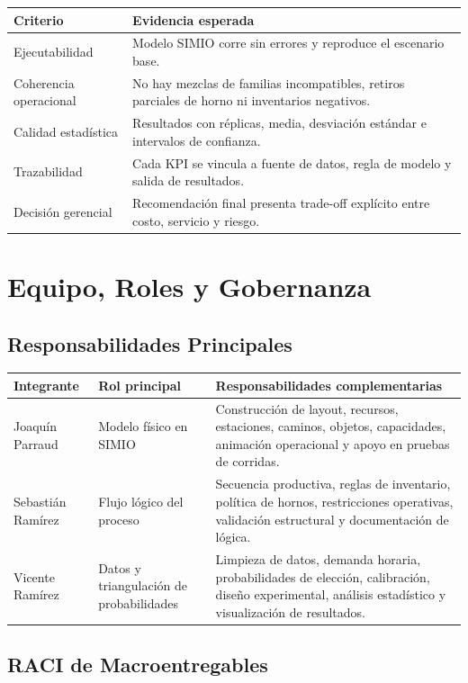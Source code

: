 \documentclass[11pt,letterpaper]{article}
\begin{document}
\begin{tabularx}{\textwidth}{L{4.1cm}Y}
  \toprule
  \textbf{Criterio} & \textbf{Evidencia esperada} \\
  \midrule
  Ejecutabilidad & Modelo SIMIO corre sin errores y reproduce el escenario base. \\
  Coherencia operacional & No hay mezclas de familias incompatibles, retiros parciales de horno ni inventarios negativos. \\
  Calidad estadística & Resultados con réplicas, media, desviación estándar e intervalos de confianza. \\
  Trazabilidad & Cada KPI se vincula a fuente de datos, regla de modelo y salida de resultados. \\
  Decisión gerencial & Recomendación final presenta trade-off explícito entre costo, servicio y riesgo. \\
  \bottomrule
\end{tabularx}

\section{Equipo, Roles y Gobernanza}

\subsection{Responsabilidades Principales}

\begin{tabularx}{\textwidth}{L{3.3cm}L{4.4cm}Y}
  \toprule
  \textbf{Integrante} & \textbf{Rol principal} & \textbf{Responsabilidades complementarias} \\
  \midrule
  Joaquín Parraud & Modelo físico en SIMIO & Construcción de layout, recursos, estaciones, caminos, objetos, capacidades, animación operacional y apoyo en pruebas de corridas. \\
  Sebastián Ramírez & Flujo lógico del proceso & Secuencia productiva, reglas de inventario, política de hornos, restricciones operativas, validación estructural y documentación de lógica. \\
  Vicente Ramírez & Datos y triangulación de probabilidades & Limpieza de datos, demanda horaria, probabilidades de elección, calibración, diseño experimental, análisis estadístico y visualización de resultados. \\
  \bottomrule
\end{tabularx}

\subsection{RACI de Macroentregables}
\end{document}
